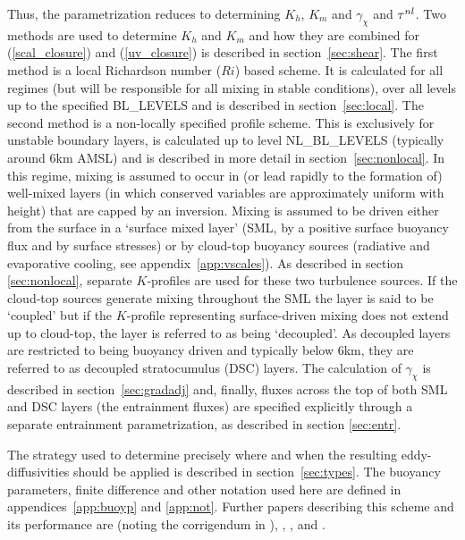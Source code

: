 \documentclass{UMDP_article}
\begin{document}
Thus, the parametrization reduces to determining $K_h$, $K_m$ and
$\gamma_{\chi}$ and ${\bf \tau}^{nl}$.  Two methods are used to
determine $K_h$ and $K_m$ and how they are combined for
(\ref{scal_closure}) and (\ref{uv_closure}) is described in
section~\ref{sec:shear}.  The first method is a local Richardson
number ($Ri$) based scheme.  It is calculated for all regimes (but
will be responsible for all mixing in stable conditions), over all
levels up to the specified BL\_LEVELS and is described in
section~\ref{sec:local}.  The second method is a non-locally specified
profile scheme.  This is exclusively for unstable boundary layers, is
calculated up to level NL\_BL\_LEVELS (typically around 6km AMSL) and
is described in more detail in section~\ref{sec:nonlocal}.  In this
regime, mixing is assumed to occur in (or lead rapidly to the
formation of) well-mixed layers (in which conserved variables are
approximately uniform with height) that are capped by an inversion.
Mixing is assumed to be driven either from the surface in a `surface
mixed layer' (SML, by a positive surface buoyancy flux and by surface
stresses) or by cloud-top buoyancy sources (radiative and evaporative
cooling, see appendix~\ref{app:vscales}).  As described in section
\ref{sec:nonlocal}, separate $K$-profiles are used for these two
turbulence sources.  If the cloud-top sources generate mixing
throughout the SML the layer is said to be `coupled' but if the
$K$-profile representing surface-driven mixing does not extend up to
cloud-top, the layer is referred to as being `decoupled'.  As
decoupled layers are restricted to being buoyancy driven and typically
below 6km, they are referred to as decoupled stratocumulus (DSC)
layers.  The calculation of $\gamma_{\chi}$ is described in
section~\ref{sec:gradadj} and, finally, fluxes across the top of both
SML and DSC layers (the entrainment fluxes) are specified explicitly
through a separate entrainment parametrization, as described in
section \ref{sec:entr}.

The strategy used to determine precisely where and when the resulting
eddy-diffusivities should be applied is described in
section~\ref{sec:types}.  The buoyancy parameters, finite difference
and other notation used here are defined in appendices~\ref{app:buoyp}
and \ref{app:not}.  Further papers describing this scheme and its
performance are \cite{lock00} (noting the corrigendum in
\cite{locketal01_corr}), \cite{martin00:_new_bound_layer_mixin_schem},
\cite{lock01}, \cite{bushetal1999} and
\cite{brown08:_upgrad_bound_layer_schem_met}.
\end{document}
